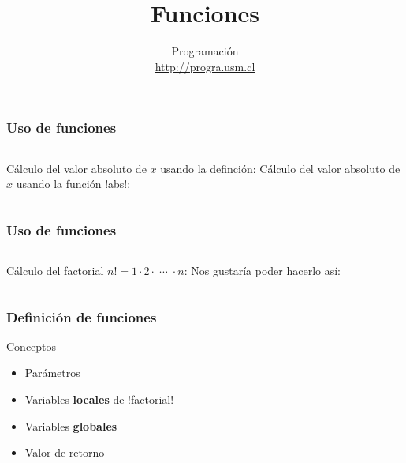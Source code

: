\documentclass[12pt]{beamer}
\title{Funciones}
\author{
  Programación \\ \url{http://progra.usm.cl}
}
\date{}
\begin{document}
  \begin{frame}
    \maketitle
  \end{frame}

  \begin{frame}
    \frametitle{Uso de funciones}
    \label{uso-funcion-abs}
    \begin{columns}[t]
        Cálculo del valor absoluto de \(x\)
        usando la definción:
        Cálculo del valor absoluto de \(x\)
        usando la función \li!abs!:
    \end{columns}
    \vspace{2ex}
    \begin{columns}[t]
        \footnotesize
        
        \footnotesize
        
    \end{columns}
  \end{frame}

  \begin{frame}
    \frametitle{Uso de funciones}
    \label{uso-funcion-factorial}
    \begin{columns}[t]
        Cálculo del factorial \(n! = 1\cdot 2\cdot\;\cdots\;\cdot n\):
        Nos gustaría
        poder hacerlo así:
    \end{columns}
    \vspace{2ex}
    \begin{columns}[t]
        \footnotesize
        
        \footnotesize
        
    \end{columns}
  \end{frame}

  \begin{frame}
    \frametitle{Definición de funciones}
    \label{def-fn-factorial}
    
  \end{frame}

  \begin{frame}
    \label{conceptos-funciones}
    \begin{block}{Conceptos}
      \begin{itemize}
        \item Parámetros
        \item Variables \textbf{locales} de \li!factorial!
        \item Variables \textbf{globales}
        \item Valor de retorno
      \end{itemize}
    \end{block}
    \footnotesize
    
  \end{frame}
\end{document}
